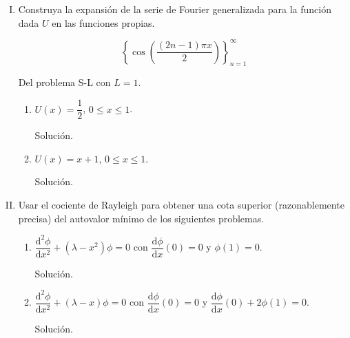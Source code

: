 \documentclass[fleqn]{article}
\newcommand{\despar}[3]{\dfrac{\mathrm{d}^#1 #2}{\mathrm{d} #3^#1}}
\newcommand{\depar}[2]{\dfrac{\mathrm{d} #1}{\mathrm{d} #2}}
\begin{document}
\begin{enumerate}[I.]

		\bfseries
			
		\item Construya la expansión de la serie de Fourier generalizada para la función dada $U$ en las funciones propias.
		
		\begin{equation*}
			\left\lbrace \cos \left( \dfrac{(2n - 1) \pi x}{2} \right) \right\rbrace_{n=1}^{\infty}
		\end{equation*}

		Del problema S-L con $ L = 1 $.
		
		\begin{enumerate}
			\item $ U(x) = \dfrac{1}{2} $, $ 0 \leq x \leq 1 $.
			
			Solución.
			
			\normalfont




			\bfseries
			
			\item $ U(x) = x + 1 $, $ 0 \leq x \leq 1 $.
			
			Solución.
			
			\normalfont



		\end{enumerate}
		

		\bfseries
			
		\item Usar el cociente de Rayleigh para obtener una cota superior (razonablemente precisa) del autovalor mínimo de los siguientes problemas.
		
		\begin{enumerate}
			\item $ \despar{2}{\phi}{x} + (\lambda - x^2) \phi = 0 $ con $ \depar{\phi}{x} (0) = 0 $ y $ \phi (1) = 0 $.
			
			Solución.
			
			\normalfont




			\bfseries
			
			\item $ \despar{2}{\phi}{x} + (\lambda - x) \phi = 0 $ con $ \depar{\phi}{x} (0) = 0 $ y $ \depar{\phi}{x} (0) + 2 \phi (1) = 0 $.
			
			Solución.
			
			\normalfont



		\end{enumerate}
	\end{enumerate}
\end{document}
